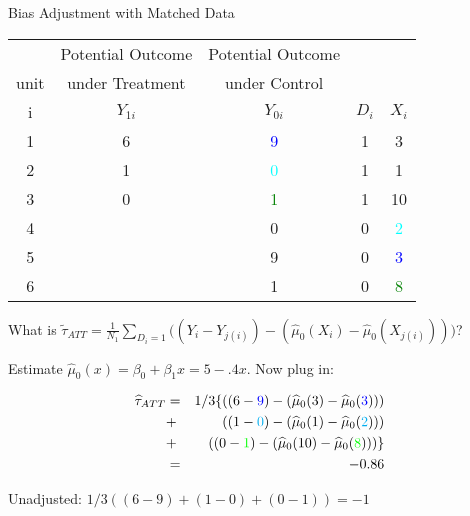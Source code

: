 \documentclass{beamer}
\numberwithin{equation}{section}
\begin{document}
\begin{frame}{Bias Adjustment with Matched Data}

\footnotesize 

\begin{tabular}{c|c|c|c|c}
 &Potential Outcome & Potential Outcome &   & \\
unit &under Treatment  & under Control &   &  \\
\hline
   i  & $Y_{1i}$  & $Y_{0i}$ &    $D_i$ &  $X_i$ \\
\hline
         1 & \multicolumn{ 1}{c|}{6} & \multicolumn{ 1}{c|}{\textcolor{blue}{9}} &                    1 &          3 \\
         2 & \multicolumn{ 1}{c|}{1} & \multicolumn{ 1}{c|}{\textcolor{cyan}{0}} &                    1 &          1 \\
         3 & \multicolumn{ 1}{c|}{0} & \multicolumn{ 1}{c|}{\textcolor{green}{1}} &                    1 &          10 \\
\hline
         4 & \multicolumn{ 1}{c|}{} & \multicolumn{1}{c|}{0} &                    0 &          \textcolor{cyan}{2} \\
         5 & \multicolumn{ 1}{c|}{} & \multicolumn{1}{c|}{9} &                    0 &          \textcolor{blue}{3} \\
         6 & \multicolumn{ 1}{c|}{} & \multicolumn{1}{c|}{1} &                    0 &          \textcolor{green}{8} \\
         \hline
\end{tabular}

What is
$\tilde\tau_{ATT}= \frac{1}{N_1}\sum_{D_i=1} \Big((Y_i-Y_{j(i)})- (\widehat\mu_0(X_i)-\widehat\mu_0(X_{j(i)})) \Big)$?

Estimate $\widehat\mu_0(x)=\beta_0 + \beta_1 x = 5 - .4 x$. \pause Now
plug in:

\begin{eqnarray*}
\widehat{\tau}_{ATT} &=&1/3 \{ ((6-\textcolor{blue}{9})-(\widehat\mu_0(3)-\widehat\mu_0(\textcolor{blue}{3})))\\
&+&((1-\textcolor{cyan}{0})-(\widehat\mu_0(1)-\widehat\mu_0(\textcolor{cyan}{2})))\\
&+&((0-\textcolor{green}{1})-
(\widehat\mu_0(10)-\widehat\mu_0(\textcolor{green}{8})))\}\\
&=& -0.86
\end{eqnarray*}

Unadjusted:  $1/3((6-9) + (1-0) + (0-1) )=-1$

\end{frame}
\end{document}
